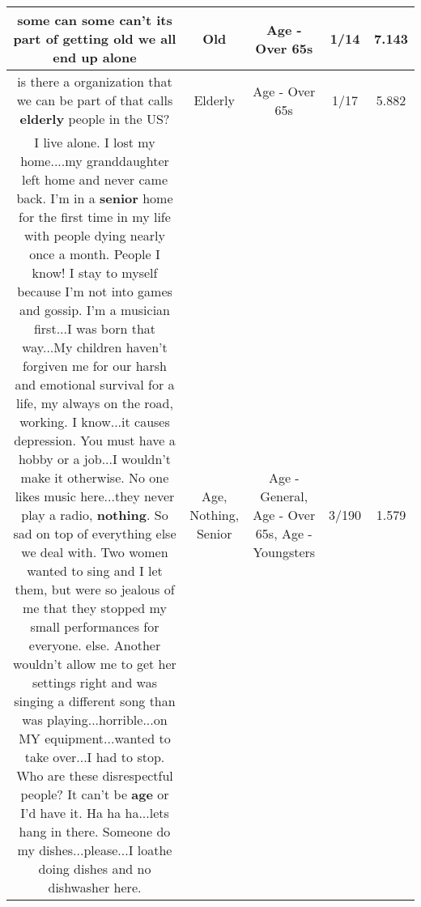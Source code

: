 \documentclass[11pt]{article}
\newlength\mylength
\begin{document}
\begin{center}
\begin{longtable}{|C{.65\mylength}|C{.30\mylength}|C{.12\mylength}|C{.12\mylength}|C{.12\mylength}|}
  \small some can some can't its part of getting \textbf{old} we all end up alone\normalsize   & Old & Age - Over 65s & 1/14 & 7.143 \\  \hline
  \small is there a organization that we can be part of that calls \textbf{elderly} people in the US?\normalsize   & Elderly & Age - Over 65s & 1/17 & 5.882 \\  \hline
  \small I live alone. I lost my home....my granddaughter left home and never came back. I'm in a \textbf{senior} home for the first time in my life with people dying nearly once a month. People I know! I stay to myself because I'm not into games and gossip. I'm a musician first...I was born that way...My children haven't forgiven me for our harsh and emotional survival for a life, my always on the road, working.  I know...it causes depression.  You must have a hobby or a job...I wouldn't make it otherwise.  No one likes music here...they never play a radio, \textbf{nothing}.  So sad on top of everything else we deal with.  Two women wanted to sing and I let them, but were so jealous of me that they stopped my small performances for everyone. else.  Another wouldn't allow me to get her settings right  and was singing a different song than was playing...horrible...on MY equipment...wanted to take over...I had to stop.  Who are these disrespectful people? It can't be \textbf{age} or I'd have it. Ha ha ha...lets hang in there. Someone do my dishes...please...I loathe doing dishes and no dishwasher here.\normalsize   & Age, Nothing, Senior & Age - General, Age - Over 65s, Age - Youngsters & 3/190 & 1.579 \\  \hline

\end{longtable}
\end{center}
\end{document}
